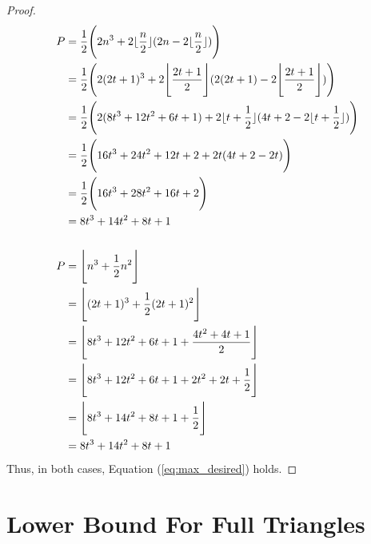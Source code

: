\documentclass[10pt]{amsart}
\DeclarePairedDelimiter{\floor}{\lfloor}{\rfloor}
\begin{document}
\begin{proof}
    \begin{align}
        P &= \frac{1}{2} \bparen{2n^3 + 2\floor{\frac{n}{2}}(2n - 2\floor{\frac{n}{2}})}                                  \notag \\
          &= \frac{1}{2} \bparen{2(2t + 1)^3 + 2\bfloor{\frac{2t + 1}{2}}(2(2t + 1) - 2\bfloor{\frac{2t + 1}{2}})}        \notag \\
          &= \frac{1}{2} \bparen{2(8t^3 + 12t^2 + 6t + 1) + 2\floor{t + \frac{1}{2}}(4t + 2 - 2\floor{t + \frac{1}{2}})}  \notag \\
          &= \frac{1}{2} \bparen{16t^3 + 24t^2 + 12t + 2 + 2t(4t + 2 - 2t)}                                               \notag \\
          &= \frac{1}{2} \bparen{16t^3 + 28t^2 + 16t + 2}                                                                 \notag \\
          &= 8t^3 + 14t^2 + 8t + 1                                                                                        \notag \\
        \notag \\
        P &= \bfloor{ n^3 + \frac{1}{2}n^2 }                                                                              \notag \\
          &= \bfloor{ (2t + 1)^3 + \frac{1}{2}(2t + 1)^2 }                                                                \notag \\
          &= \bfloor{ 8t^3 + 12t^2 + 6t + 1 + \frac{4t^2 + 4t + 1}{2} }                                                   \notag \\
          &= \bfloor{ 8t^3 + 12t^2 + 6t + 1 + 2t^2 + 2t + \frac{1}{2} }                                                   \notag \\
          &= \bfloor{ 8t^3 + 14t^2 + 8t + 1 + \frac{1}{2} }                                                               \notag \\
          &= 8t^3 + 14t^2 + 8t + 1                                                                                        \notag
    \end{align}
    Thus, in both cases, Equation (\ref{eq:max_desired}) holds.
\end{proof}


\section{Lower Bound For Full Triangles} %
\end{document}
